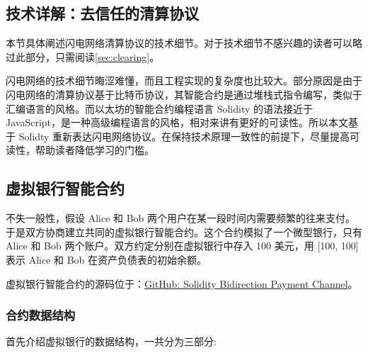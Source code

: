 \begin{appendices}


\section{技术详解：去信任的清算协议}
本节具体阐述闪电网络清算协议的技术细节。对于技术细节不感兴趣的读者可以略过此部分，只需阅读\ref{sec:clearing}。

闪电网络的技术细节晦涩难懂，而且工程实现的复杂度也比较大。部分原因是由于闪电网络的清算协议基于比特币协议，其智能合约是通过堆栈式指令编写，类似于汇编语言的风格。而以太坊的智能合约编程语言 Solidity 的语法接近于 JavaScript，是一种高级编程语言的风格，相对来讲有更好的可读性。所以本文基于 Solidty 重新表达闪电网络协议。在保持技术原理一致性的前提下，尽量提高可读性，帮助读者降低学习的门槛。

\subsection{虚拟银行智能合约}

不失一般性，假设 Alice 和 Bob 两个用户在某一段时间内需要频繁的往来支付。于是双方协商建立共同的虚拟银行智能合约。这个合约模拟了一个微型银行，只有 Alice 和 Bob 两个账户。双方约定分别在虚拟银行中存入 100 美元，用 [100, 100] 表示 Alice 和 Bob 在资产负债表的初始余额。

虚拟银行智能合约的源码位于：\href{https://github.com/dapenghu/solidity-bidirection-payment-channel/blob/master/virtualBank/contracts/VirtualBank.sol}{GitHub: Solidity Bidirection Payment Channel}。

\subsubsection{合约数据结构}
首先介绍虚拟银行的数据结构，一共分为三部分:


\end{appendices}
